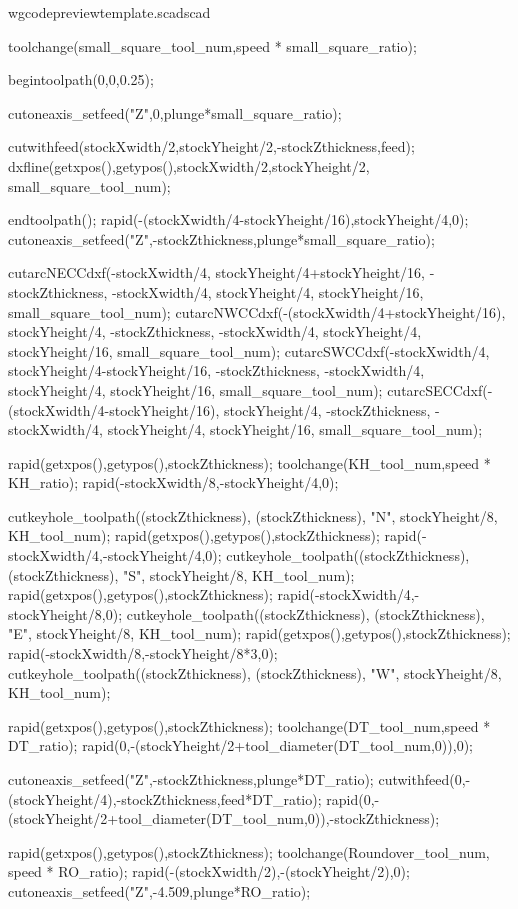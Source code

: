 \documentclass{ltxdoc}
\begin{document}
\begin{writecode}{w}{gcodepreviewtemplate.scad}{scad}
{toolchange(small_square_tool_num,speed * small_square_ratio);

begintoolpath(0,0,0.25);

cutoneaxis_setfeed("Z",0,plunge*small_square_ratio);

cutwithfeed(stockXwidth/2,stockYheight/2,-stockZthickness,feed);
dxfline(getxpos(),getypos(),stockXwidth/2,stockYheight/2, small_square_tool_num);

endtoolpath();
rapid(-(stockXwidth/4-stockYheight/16),stockYheight/4,0);
cutoneaxis_setfeed("Z",-stockZthickness,plunge*small_square_ratio);

cutarcNECCdxf(-stockXwidth/4, stockYheight/4+stockYheight/16, -stockZthickness, -stockXwidth/4, stockYheight/4, stockYheight/16, small_square_tool_num);
cutarcNWCCdxf(-(stockXwidth/4+stockYheight/16), stockYheight/4, -stockZthickness, -stockXwidth/4, stockYheight/4, stockYheight/16, small_square_tool_num);
cutarcSWCCdxf(-stockXwidth/4, stockYheight/4-stockYheight/16, -stockZthickness, -stockXwidth/4, stockYheight/4, stockYheight/16, small_square_tool_num);
cutarcSECCdxf(-(stockXwidth/4-stockYheight/16), stockYheight/4, -stockZthickness, -stockXwidth/4, stockYheight/4, stockYheight/16, small_square_tool_num);

rapid(getxpos(),getypos(),stockZthickness);
toolchange(KH_tool_num,speed * KH_ratio);
rapid(-stockXwidth/8,-stockYheight/4,0);

cutkeyhole_toolpath((stockZthickness), (stockZthickness), "N", stockYheight/8, KH_tool_num);
rapid(getxpos(),getypos(),stockZthickness);
rapid(-stockXwidth/4,-stockYheight/4,0);
cutkeyhole_toolpath((stockZthickness), (stockZthickness), "S", stockYheight/8, KH_tool_num);
rapid(getxpos(),getypos(),stockZthickness);
rapid(-stockXwidth/4,-stockYheight/8,0);
cutkeyhole_toolpath((stockZthickness), (stockZthickness), "E", stockYheight/8, KH_tool_num);
rapid(getxpos(),getypos(),stockZthickness);
rapid(-stockXwidth/8,-stockYheight/8*3,0);
cutkeyhole_toolpath((stockZthickness), (stockZthickness), "W", stockYheight/8, KH_tool_num);

rapid(getxpos(),getypos(),stockZthickness);
toolchange(DT_tool_num,speed * DT_ratio);
rapid(0,-(stockYheight/2+tool_diameter(DT_tool_num,0)),0);

cutoneaxis_setfeed("Z",-stockZthickness,plunge*DT_ratio);
cutwithfeed(0,-(stockYheight/4),-stockZthickness,feed*DT_ratio);
rapid(0,-(stockYheight/2+tool_diameter(DT_tool_num,0)),-stockZthickness);

rapid(getxpos(),getypos(),stockZthickness);
toolchange(Roundover_tool_num, speed * RO_ratio);
rapid(-(stockXwidth/2),-(stockYheight/2),0);
cutoneaxis_setfeed("Z",-4.509,plunge*RO_ratio);

}
\end{writecode}
\end{document}
